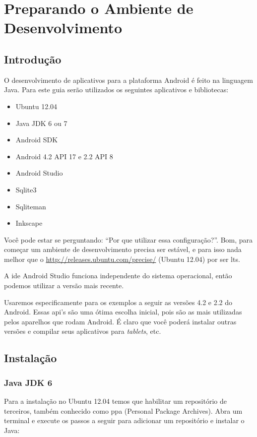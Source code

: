 \chapter{Preparando o Ambiente de Desenvolvimento}

\section{Introdução}

O desenvolvimento de aplicativos para a plataforma Android é feito na
linguagem Java. Para este guia serão utilizados os seguintes aplicativos
e bibliotecas:

\begin{itemize}
\item
  Ubuntu 12.04
\item
  Java JDK 6 ou 7
\item
  Android SDK
\item
  Android 4.2 API 17 e 2.2 API 8
\item
  Android Studio
\item
  Sqlite3
\item
  Sqliteman
\item
  Inkscape
\end{itemize}
Você pode estar se perguntando: ``Por que utilizar essa configuração?''.
Bom, para começar um ambiente de desenvolvimento precisa ser estável, e
para isso nada melhor que o \url{http://releases.ubuntu.com/precise/}
(Ubuntu 12.04) por ser \gls{lts}.

A \gls{ide} Android Studio funciona independente do sistema operacional,
então podemos utilizar a versão mais recente.

Usaremos especificamente para os exemplos a seguir as versões 4.2 e 2.2
do Android. Essas \gls{api}'s são uma ótima escolha inicial, pois são as
mais utilizadas pelos aparelhos que rodam Android. É claro que você
poderá instalar outras versões e compilar seus aplicativos para
\emph{tablets}, etc.

\section{Instalação}

\subsection{Java JDK 6}

Para a instalação no Ubuntu 12.04 temos que habilitar um repositório de
terceiros, também conhecido como \gls{ppa} (Personal Package Archives).
Abra um terminal e execute os passos a seguir para adicionar um
repositório e instalar o Java:

